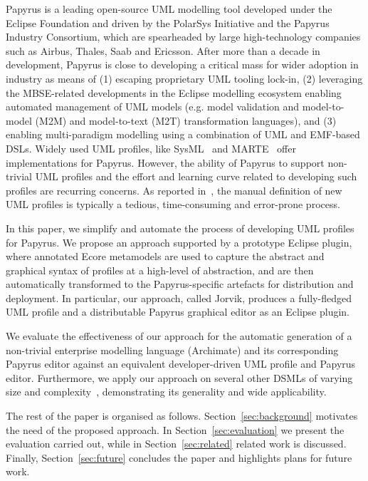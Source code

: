 Papyrus \cite{lanusse2009papyrus} is a leading open-source UML modelling tool developed under the Eclipse Foundation and driven by the PolarSys Initiative and the Papyrus Industry Consortium, which are spearheaded by large high-technology companies such as Airbus, Thales, Saab and Ericsson.  
After more than a decade in development, Papyrus is close to developing a critical mass for wider adoption in industry as means of (1) escaping proprietary UML tooling lock-in, (2) leveraging the MBSE-related developments in the Eclipse modelling ecosystem enabling automated management of UML models (e.g. model validation and model-to-model (M2M) and model-to-text (M2T) transformation languages), and (3) enabling multi-paradigm modelling using a combination of UML and EMF-based DSLs. 
Widely used UML profiles, like SysML~\cite{friedenthal2014practical} and MARTE~\cite{omg2011marte} offer implementations for Papyrus. 
However, the ability of Papyrus to support non-trivial UML profiles and the effort and learning curve related to developing such profiles are recurring concerns. 
As reported in~\cite{Wimmer2009:IJWIS}, the manual definition of new UML profiles is typically a tedious, time-consuming and error-prone process.

In this paper, we simplify and automate the process of developing UML profiles for Papyrus. 
We propose an approach supported by a prototype Eclipse plugin, where annotated Ecore metamodels are used to capture the abstract and graphical syntax of profiles at a high-level of abstraction, and are then automatically transformed to the Papyrus-specific artefacts for distribution and deployment. 
In particular, our approach, called Jorvik, produces a fully-fledged UML profile and a distributable Papyrus graphical editor as an Eclipse plugin. 

We evaluate the effectiveness of our approach for the automatic generation of a non-trivial enterprise modelling language (Archimate) and its corresponding Papyrus editor against an equivalent developer-driven UML profile and Papyrus editor. 
Furthermore, we apply our approach on several other DSMLs of varying size and complexity~\cite{williams2013metamodels}, demonstrating its generality and wide applicability.

The rest of the paper is organised as follows. 
Section~\ref{sec:background} motivates the need of the proposed approach. 
In Section~\ref{sec:evaluation} we present the evaluation carried out, while in Section~\ref{sec:related} related work is discussed. 
Finally, Section~\ref{sec:future} concludes the paper and highlights plans for future work.